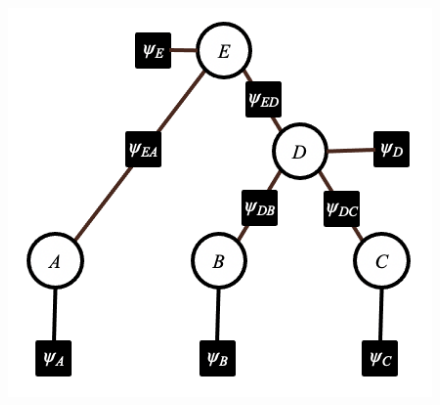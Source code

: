 \documentclass[11pt,addpoints,answers]{exam}
\numberwithin{equation}{section} %
\numberwithin{figure}{section} %
\numberwithin{table}{section} %
\begin{document}
\noindent
\begin{minipage}{.4\textwidth}

\begin{figure}[H]
    \centering
    \includegraphics[width=\textwidth]{fig/tree_binary.png}
    \caption{}
    \label{fig:tree_abcde}
\end{figure}

\end{minipage}%
\end{document}
